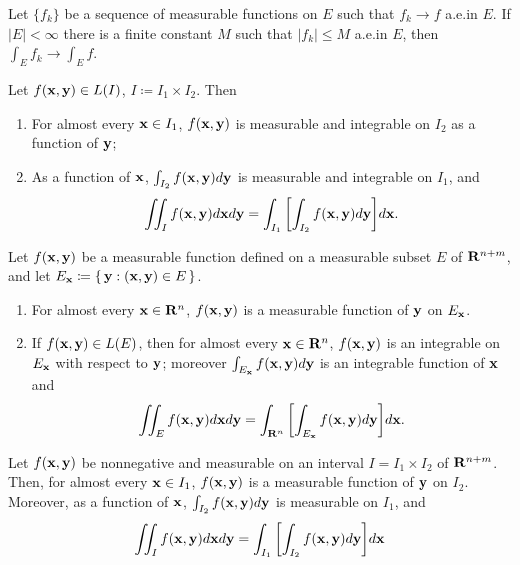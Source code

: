 \begin{corollary*}
Let $\{f_k\}$ be a sequence of measurable functions on $E$ such  that
$f_k\to f$ a.e.\@ in $E$. If $|E|<\infty$ there is a finite constant $M$
such that $|f_k|\leq M$ a.e.\@ in $E$, then $\int_E f_k\to\int_E f$.
\end{corollary*}
\begin{theorem*}
Let $f(\mathbf{x},\mathbf{y})\in L(I)$, $I\coloneqq I_1\times I_2$. Then
\begin{enumerate}[label=\textnormal{(\roman*)}]
\item For almost every $\mathbf{x}\in I_1$, $f(\mathbf{x},\mathbf{y})$ is measurable and
  integrable on $I_2$ as a function of $\mathbf{y}$;
\item As a function of $\mathbf{x}$, $\int_{I_2} f(\mathbf{x},\mathbf{y}) d \mathbf{y}$ is
  measurable and integrable on $I_1$, and
\[
\iint_I f(\mathbf{x},\mathbf{y}) d \mathbf{x} d \mathbf{y}=
\int_{I_1}\left[\int_{I_2}f(\mathbf{x},\mathbf{y}) d \mathbf{y}\right]\! d \mathbf{x}.
\]
\end{enumerate}
\end{theorem*}
\begin{theorem*}[6.8]
Let $f(\mathbf{x},\mathbf{y})$ be a measurable function defined on a measurable subset
$E$ of $\mathbf{R}^{n+m}$, and let $E_{\mathbf{x}}\coloneqq\left\{ \,\mathbf{y}:(\mathbf{x},\mathbf{y})\in
  E \,\right\}$.
\begin{enumerate}[label=\textnormal{(\roman*)}]
\item For almost every $\mathbf{x}\in \mathbf{R}^n$, $f(\mathbf{x},\mathbf{y})$ is a measurable
  function of $\mathbf{y}$ on $E_{\mathbf{x}}$.
\item If $f(\mathbf{x},\mathbf{y})\in L(E)$, then for almost every $\mathbf{x}\in\mathbf{R}^n$,
  $f(\mathbf{x},\mathbf{y})$ is an integrable on $E_{\mathbf{x}}$ with respect to $\mathbf{y}$;
  moreover $\int_{E_{\mathbf{x}}}f(\mathbf{x},\mathbf{y}) d \mathbf{y}$ is an integrable function
  of $\mathbf{x}$ and
\[
\iint_E f(\mathbf{x},\mathbf{y}) d \mathbf{x} d \mathbf{y}=\int_{\mathbf{R}^n}\left[\int_{E_{\mathbf{x}}}f(\mathbf{x},\mathbf{y}) d \mathbf{y}\right]\! d \mathbf{x}.
\]
\end{enumerate}
\end{theorem*}
\begin{theorem*}
Let $f(\mathbf{x},\mathbf{y})$ be nonnegative and measurable on an interval
$I=I_1\times I_2$ of $\mathbf{R}^{n+m}$. Then, for almost every $\mathbf{x}\in I_1$,
$f(\mathbf{x},\mathbf{y})$ is a measurable function of $\mathbf{y}$ on $I_2$. Moreover, as a
function of $\mathbf{x}$, $\int_{I_2}f(\mathbf{x},\mathbf{y}) d  \mathbf{y}$ is measurable on
$I_1$, and
\[
\iint_I f(\mathbf{x},\mathbf{y}) d \mathbf{x} d \mathbf{y}=\int_{I_1}\left[\int_{I_2}f(\mathbf{x},\mathbf{y}) d \mathbf{y}\right]\! d \mathbf{x}
\]
\end{theorem*}
